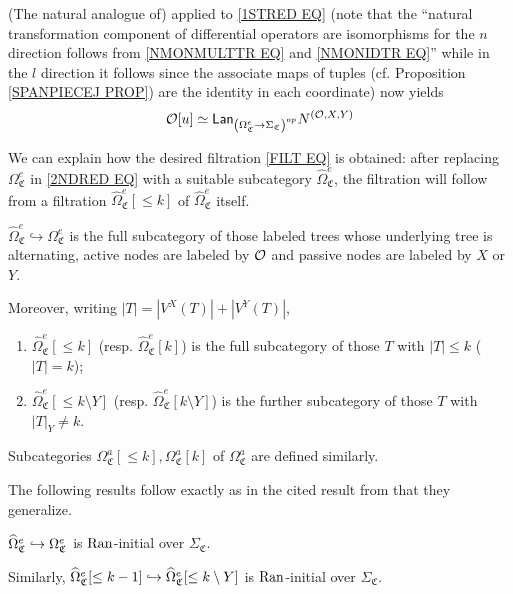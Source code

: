 \documentclass[a4paper,10pt
,draft
]{article}%
\renewcommand{\1}{\eta}%
\newcommand{\SC}{\Sigma_{\mathfrak C}}
\newcommand{\OC}{\Omega_{\mathfrak C}}
\begin{document}
(The natural analogue of) \cite[Prop 5.37]{BP_geo}
applied to 
\eqref{1STRED EQ}
(note that the ``natural transformation component of differential operators are isomorphisms for the $n$ direction follows from \eqref{NMONMULTTR EQ} and \eqref{NMONIDTR EQ}''
while in the $l$ direction it follows since the associate maps of tuples (cf. Proposition \ref{SPANPIECEJ PROP}) are the identity in each coordinate) now yields
\begin{equation}\label{2NDRED EQ}
\mathcal{O}[u] \simeq
	\mathsf{Lan}_{\left(\Omega_{\mathfrak C}^{e} \to
	\Sigma_{\mathfrak C}\right)^{op}} N^{(\mathcal{O},X,Y)}
\end{equation}

We can explain how the desired filtration 
\eqref{FILT EQ} is obtained:
after replacing  
$\Omega_{\mathfrak C}^{e}$
in \eqref{2NDRED EQ}
with a suitable subcategory 
$\widehat{\Omega}_{\mathfrak C}^{e}$,
the filtration will follow from a filtration 
$\widehat{\Omega}_{\mathfrak C}^{e}[\leq k]$
of 
$\widehat{\Omega}_{\mathfrak C}^{e}$ itself.


\begin{definition}
$\widehat{\Omega}_{\mathfrak C}^{e} \hookrightarrow \Omega_{\mathfrak C}^{e}$
is the full subcategory of those labeled trees whose underlying tree is alternating, active nodes are labeled by $\mathcal{O}$ 
and passive nodes are labeled by $X$ or $Y$.

Moreover, writing $|T| = |V^X(T)|+ |V^Y(T)|$,
\begin{enumerate}[label=(\roman*)]
\item $\widehat{\Omega}_{\mathfrak C}^{e}[\leq k]$ (resp. $\widehat{\Omega}_{\mathfrak C}^{e}[k]$)
is the full subcategory of those $T$ with $|T| \leq k$ ($|T|=k$);
\item $\widehat{\Omega}_{\mathfrak C}^{e}[\leq k \setminus Y]$ (resp. $\widehat{\Omega}_{\mathfrak C}^{e}[k \setminus Y]$)
is the further subcategory of those $T$ with $|T|_Y \neq k$.
\end{enumerate}
Subcategories $\OC^a[\leq k], \OC^a[k]$ of $\OC^a$ are defined similarly.
\end{definition}



The following results follow exactly as in the cited result from 
\cite{BP_geo} that they generalize.

\begin{lemma}
\label{LANINT LEM}

	$\widehat\Omega_{\mathfrak C}^e \hookrightarrow 
	\Omega_{\mathfrak C}^e$
	is $\operatorname{Ran}$-initial over $\SC$.
     
	Similarly, $\widehat\Omega_{\mathfrak C}^e[\leq k-1] \hookrightarrow 
\widehat\Omega_{\mathfrak C}^e[\leq k \setminus Y]$
	is $\operatorname{Ran}$-initial over $\SC$.
\end{lemma}
\end{document}
